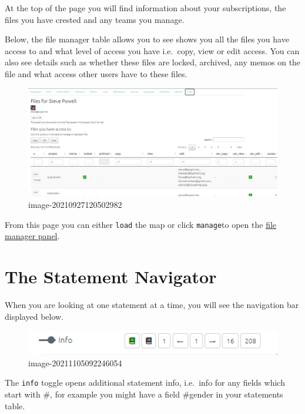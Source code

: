 \documentclass[
]{book}
\begin{document}
At the top of the page you will find information about your subscriptions, the files you have crested and any teams you manage.

Below, the file manager table allows you to see shows you all the files you have access to and what level of access you have i.e.~copy, view or edit access. You can also see details such as whether these files are locked, archived, any memos on the file and what access other users have to these files.

\begin{figure}
\centering
\includegraphics[width=6.77083in,height=\textheight]{_assets/image-20210927120502982.png}
\caption{image-20210927120502982}
\end{figure}

From this page you can either \texttt{load} the map or click \texttt{manage}to open the \protect\hyperlink{xpermissions}{file manager panel}.

\hypertarget{xstatement-nav-old}{%
\chapter{The Statement Navigator}\label{xstatement-nav-old}}

When you are looking at one statement at a time, you will see the navigation bar displayed below.

\begin{figure}
\centering
\includegraphics{_assets/image-20211105092246054.png}
\caption{image-20211105092246054}
\end{figure}

The \texttt{info} toggle opens additional statement info, i.e.~info for any fields which start with \#, for example you might have a field \#gender in your statements table.
\end{document}
